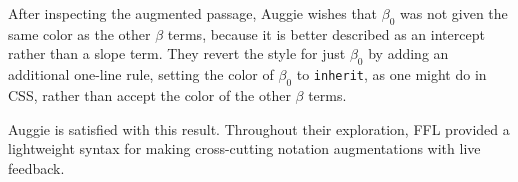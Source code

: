 After inspecting the augmented passage, Auggie wishes that $\beta_0$ was not given the same color as the other $\beta$ terms, because it is better described as an intercept rather than a slope term. They revert the style for just $\beta_0$ by adding an additional one-line rule, setting the color of $\beta_0$ to \texttt{inherit}, as one might do in CSS, rather than accept the color of the other $\beta$ terms.\\



Auggie is satisfied with this result. Throughout their exploration, FFL provided a lightweight syntax for making cross-cutting notation augmentations with live feedback.

